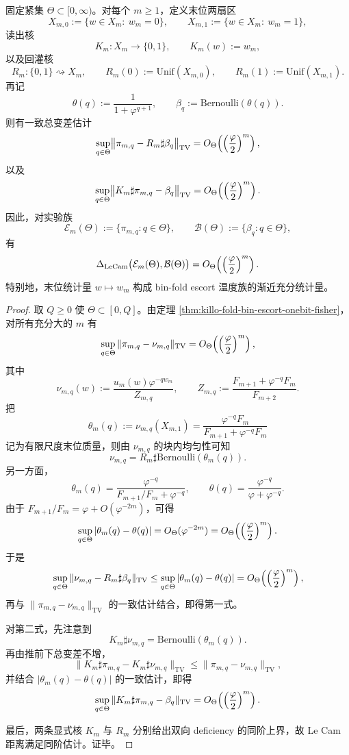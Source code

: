 \begin{theorem}\label{thm:conclusion-binfold-escort-blackwell-equivalence}
固定紧集 \(\Theta\subset[0,\infty)\)。对每个 \(m\ge 1\)，定义末位两扇区
\[
X_{m,0}:=\{w\in X_m:\ w_m=0\},
\qquad
X_{m,1}:=\{w\in X_m:\ w_m=1\},
\]
读出核
\[
K_m:X_m\to\{0,1\},
\qquad
K_m(w):=w_m,
\]
以及回灌核
\[
R_m:\{0,1\}\rightsquigarrow X_m,
\qquad
R_m(0):=\mathrm{Unif}(X_{m,0}),
\qquad
R_m(1):=\mathrm{Unif}(X_{m,1}).
\]
再记
\[
\theta(q):=\frac{1}{1+\varphi^{q+1}},
\qquad
\beta_q:=\mathrm{Bernoulli}(\theta(q)).
\]
则有一致总变差估计
\[
\sup_{q\in\Theta}
\bigl\|
\pi_{m,q}-R_m\sharp\beta_q
\bigr\|_{\mathrm{TV}}
=
O_\Theta\!\left(\Bigl(\frac{\varphi}{2}\Bigr)^m\right),
\]
以及
\[
\sup_{q\in\Theta}
\bigl\|
K_m\sharp\pi_{m,q}-\beta_q
\bigr\|_{\mathrm{TV}}
=
O_\Theta\!\left(\Bigl(\frac{\varphi}{2}\Bigr)^m\right).
\]
因此，对实验族
\[
\mathcal E_m(\Theta):=\{\pi_{m,q}:q\in\Theta\},
\qquad
\mathcal B(\Theta):=\{\beta_q:q\in\Theta\},
\]
有
\[
\Delta_{\mathrm{LeCam}}\bigl(\mathcal E_m(\Theta),\mathcal B(\Theta)\bigr)
=
O_\Theta\!\left(\Bigl(\frac{\varphi}{2}\Bigr)^m\right).
\]
特别地，末位统计量 \(w\mapsto w_m\) 构成 bin-fold escort 温度族的渐近充分统计量。
\end{theorem}
\begin{proof}
取 \(Q\ge 0\) 使 \(\Theta\subset[0,Q]\)。由定理 \ref{thm:killo-fold-bin-escort-onebit-fisher}，对所有充分大的 \(m\) 有
\[
\sup_{q\in\Theta}\|\pi_{m,q}-\nu_{m,q}\|_{\mathrm{TV}}
=
O_\Theta\!\left(\Bigl(\frac{\varphi}{2}\Bigr)^m\right),
\]
其中
\[
\nu_{m,q}(w)
:=
\frac{u_m(w)\varphi^{-q w_m}}{Z_{m,q}},
\qquad
Z_{m,q}:=\frac{F_{m+1}+\varphi^{-q}F_m}{F_{m+2}}.
\]
把
\[
\theta_m(q):=\nu_{m,q}(X_{m,1})
=
\frac{\varphi^{-q}F_m}{F_{m+1}+\varphi^{-q}F_m}
\]
记为有限尺度末位质量，则由 \(\nu_{m,q}\) 的块内均匀性可知
\[
\nu_{m,q}=R_m\sharp\mathrm{Bernoulli}(\theta_m(q)).
\]
另一方面，
\[
\theta_m(q)=\frac{\varphi^{-q}}{F_{m+1}/F_m+\varphi^{-q}},
\qquad
\theta(q)=\frac{\varphi^{-q}}{\varphi+\varphi^{-q}}.
\]
由于 \(F_{m+1}/F_m=\varphi+O(\varphi^{-2m})\)，可得
\[
\sup_{q\in\Theta}|\theta_m(q)-\theta(q)|
=
O_\Theta(\varphi^{-2m})
=
O_\Theta\!\left(\Bigl(\frac{\varphi}{2}\Bigr)^m\right).
\]
于是
\[
\sup_{q\in\Theta}
\|\nu_{m,q}-R_m\sharp\beta_q\|_{\mathrm{TV}}
\le
\sup_{q\in\Theta}|\theta_m(q)-\theta(q)|
=
O_\Theta\!\left(\Bigl(\frac{\varphi}{2}\Bigr)^m\right),
\]
再与 \(\|\pi_{m,q}-\nu_{m,q}\|_{\mathrm{TV}}\) 的一致估计结合，即得第一式。

对第二式，先注意到
\[
K_m\sharp\nu_{m,q}
=
\mathrm{Bernoulli}(\theta_m(q)).
\]
再由推前下总变差不增，
\[
\|K_m\sharp\pi_{m,q}-K_m\sharp\nu_{m,q}\|_{\mathrm{TV}}
\le
\|\pi_{m,q}-\nu_{m,q}\|_{\mathrm{TV}},
\]
并结合 \(|\theta_m(q)-\theta(q)|\) 的一致估计，即得
\[
\sup_{q\in\Theta}
\|K_m\sharp\pi_{m,q}-\beta_q\|_{\mathrm{TV}}
=
O_\Theta\!\left(\Bigl(\frac{\varphi}{2}\Bigr)^m\right).
\]

最后，两条显式核 \(K_m\) 与 \(R_m\) 分别给出双向 deficiency 的同阶上界，故 Le Cam 距离满足同阶估计。证毕。
\end{proof}

